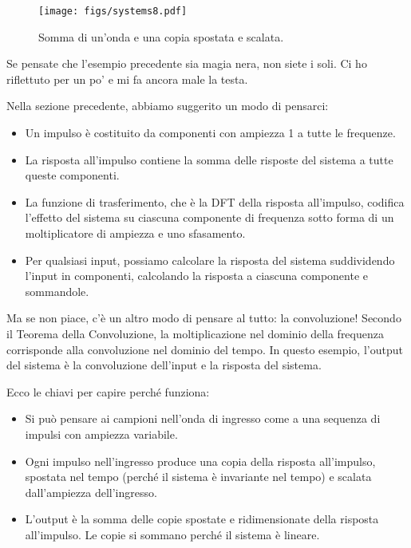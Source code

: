 \documentclass[12pt,a4paper]{book}
\begin{document}
\begin{figure} 

\centerline{\texttt{[image: figs/systems8.pdf]}} \caption{Somma di un'onda e una copia spostata e scalata.} \label{fig.systems8} \end{figure} 

Se pensate che l'esempio precedente sia magia nera, non siete i soli. Ci ho riflettuto per un po' e mi fa ancora male la testa.

Nella sezione precedente, abbiamo suggerito un modo di pensarci:

\begin{itemize} 

\item Un impulso è costituito da componenti con ampiezza 1 a tutte le frequenze.

\item La risposta all'impulso contiene la somma delle risposte del sistema a tutte queste componenti.

\item La funzione di trasferimento, che è la DFT della risposta all'impulso, codifica l'effetto del sistema su ciascuna componente di frequenza sotto forma di un moltiplicatore di ampiezza e uno sfasamento.

\item Per qualsiasi input, possiamo calcolare la risposta del sistema suddividendo l'input in componenti, calcolando la risposta a ciascuna componente e sommandole.

\end{itemize} 

Ma se non piace, c'è un altro modo di pensare al tutto: la convoluzione! Secondo il Teorema della Convoluzione, la moltiplicazione nel dominio della frequenza corrisponde alla convoluzione nel dominio del tempo. In questo esempio, l'output del sistema è la convoluzione dell'input e la risposta del sistema.

Ecco le chiavi per capire perché funziona:

\begin{itemize} 

\item Si può pensare ai campioni nell'onda di ingresso come a una sequenza di impulsi con ampiezza variabile.

\item Ogni impulso nell'ingresso produce una copia della risposta all'impulso, spostata nel tempo (perché il sistema è invariante nel tempo) e scalata dall'ampiezza dell'ingresso.

\item L'output è la somma delle copie spostate e ridimensionate della risposta all'impulso. Le copie si sommano perché il sistema è lineare.

\end{itemize} 
\end{document}
